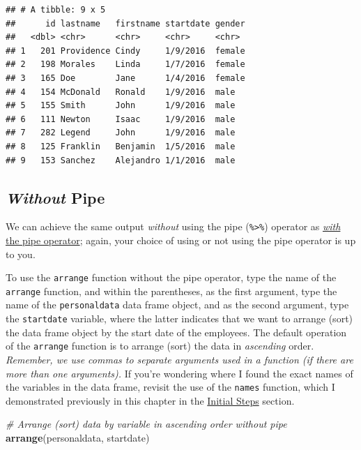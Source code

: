 \documentclass[]{book}
\newenvironment{Shaded}{\begin{snugshade}}{\end{snugshade}}
\newcommand{\KeywordTok}[1]{\textcolor[rgb]{0.13,0.29,0.53}{\textbf{#1}}}
\newcommand{\CommentTok}[1]{\textcolor[rgb]{0.56,0.35,0.01}{\textit{#1}}}
\newcommand{\NormalTok}[1]{#1}
\begin{document}
\begin{verbatim}
## # A tibble: 9 x 5
##      id lastname   firstname startdate gender
##   <dbl> <chr>      <chr>     <chr>     <chr> 
## 1   201 Providence Cindy     1/9/2016  female
## 2   198 Morales    Linda     1/7/2016  female
## 3   165 Doe        Jane      1/4/2016  female
## 4   154 McDonald   Ronald    1/9/2016  male  
## 5   155 Smith      John      1/9/2016  male  
## 6   111 Newton     Isaac     1/9/2016  male  
## 7   282 Legend     John      1/9/2016  male  
## 8   125 Franklin   Benjamin  1/5/2016  male  
## 9   153 Sanchez    Alejandro 1/1/2016  male
\end{verbatim}

\hypertarget{opt1_arrange_withoutpipe}{\subsection{\texorpdfstring{\emph{Without}
Pipe}{Without Pipe}}\label{opt1_arrange_withoutpipe}}

We can achieve the same output \emph{without} using the pipe
(\texttt{\%\textgreater{}\%}) operator as
\protect\hyperlink{opt1_arrange_withpipe}{\emph{with} the pipe
operator}; again, your choice of using or not using the pipe operator is
up to you.

To use the \texttt{arrange} function without the pipe operator, type the
name of the \texttt{arrange} function, and within the parentheses, as
the first argument, type the name of the \texttt{personaldata} data
frame object, and as the second argument, type the \texttt{startdate}
variable, where the latter indicates that we want to arrange (sort) the
data frame object by the start date of the employees. The default
operation of the \texttt{arrange} function is to arrange (sort) the data
in \emph{ascending} order. \emph{Remember, we use commas to separate
arguments used in a function (if there are more than one arguments).} If
you're wondering where I found the exact names of the variables in the
data frame, revisit the use of the \texttt{names} function, which I
demonstrated previously in this chapter in the
\protect\hyperlink{initsteps_arrange}{Initial Steps} section.

\begin{Shaded}
\begin{Highlighting}[]
\CommentTok{# Arrange (sort) data by variable in ascending order without pipe}
\KeywordTok{arrange}\NormalTok{(personaldata, startdate)}
\end{Highlighting}
\end{Shaded}
\end{document}
